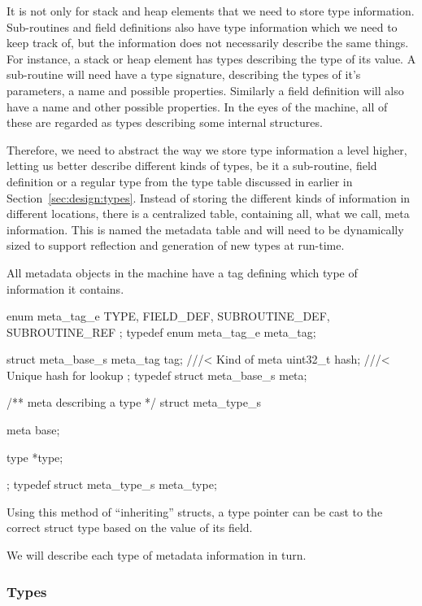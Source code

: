 It is not only for stack and heap elements that we need to store type
information. Sub-routines and field definitions also have type information which
we need to keep track of, but the information does not necessarily describe the
same things. For instance, a stack or heap element has types describing the type
of its value. A sub-routine will need have a type signature, describing the
types of it's parameters, a name and possible properties. Similarly a field
definition will also have a name and other possible properties. In the eyes of
the machine, all of these are regarded as types describing some internal
structures.

Therefore, we need to abstract the way we store type information a level higher,
letting us better describe different kinds of types, be it a sub-routine, field
definition or a regular type from the type table discussed in earlier in
Section~\ref{sec:design:types}. Instead of storing the different kinds of
information in different locations, there is a centralized table, containing
all, what we call, meta information. This is named the metadata table and will
need to be dynamically sized to support reflection and generation of new types
at run-time.

All metadata objects in the machine have a tag defining which type of
information it contains.

\begin{ccode}
enum meta_tag_e {
    TYPE,
    FIELD_DEF,
    SUBROUTINE_DEF,
    SUBROUTINE_REF
};
typedef enum meta_tag_e meta_tag;

struct meta_base_s {
    meta_tag tag;  ///< Kind of meta
    uint32_t hash; ///< Unique hash for lookup
};
typedef struct meta_base_s meta;

/** \brief meta describing a type */
struct meta_type_s {
    meta base;

    type *type;
};
typedef struct meta_type_s meta_type;
\end{ccode}

Using this method of ``inheriting'' structs, a type pointer can be cast to the
correct struct type based on the value of its  field.

We will describe each type of metadata information in turn.

\subsubsection{Types}
\label{sec:implementation:meta:types}

